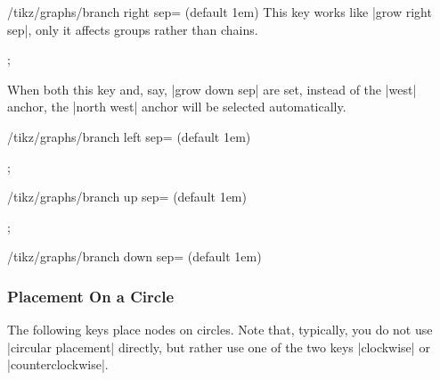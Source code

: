 \begin{key}{/tikz/graphs/branch right sep= (default 1em)}
  This key works like |grow right sep|, only it affects groups rather
  than chains.
\begin{codeexample}[]
\tikz {};      
\end{codeexample}
  When both this key and, say, |grow down sep| are set, instead of the
  |west| anchor, the |north west| anchor will be selected
  automatically. 
\end{key}

\begin{key}{/tikz/graphs/branch left sep= (default 1em)}
\begin{codeexample}[]
\tikz {};      
\end{codeexample}
\end{key}

\begin{key}{/tikz/graphs/branch up sep= (default 1em)}
\begin{codeexample}[]
\tikz {};      
\end{codeexample}
\end{key}


\begin{key}{/tikz/graphs/branch down sep= (default 1em)}
\end{key}


\subsubsection{Placement On a Circle}

The following keys place nodes on circles. Note that, typically, you
do not use |circular placement| directly, but rather use one of the
two keys |clockwise| or |counterclockwise|.

